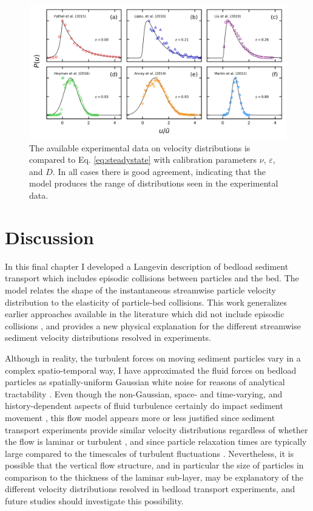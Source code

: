 \begin{figure}
	\centerline{\includegraphics{./figures/ch5/Fig4expComparison.png}}
	\caption{The available experimental data on velocity distributions is compared to Eq. \ref{eq:steadystate} with calibration parameters $\nu$, $\varepsilon$, and $D$. In all cases there is good agreement, indicating that the model produces the range of distributions seen in the experimental data.} \label{fig:fig4ch5}
\end{figure}


\section{Discussion}
\label{sec:langdiscussion}

In this final chapter I developed a Langevin description of bedload sediment transport which includes episodic collisions between particles and the bed.
The model relates the shape of the instantaneous streamwise particle velocity distribution to the elasticity of particle-bed collisions.
This work generalizes earlier approaches available in the literature which did not include episodic collisions \citep{Ancey2014,Fan2014}, and provides a new physical explanation for the different streamwise sediment velocity distributions resolved in experiments.

Although in reality, the turbulent forces on moving sediment particles vary in a complex spatio-temporal way, I have approximated the fluid forces on bedload particles as spatially-uniform Gaussian white noise for reasons of analytical tractability \cite[e.g.][]{Michaelides1997}. Even though the non-Gaussian, space- and time-varying, and history-dependent aspects of fluid turbulence certainly do impact sediment movement \citep{Cameron2020,Celik2014}, this flow model appears more or less justified since sediment transport experiments provide similar velocity distributions regardless of whether the flow is laminar or turbulent \citep{Lajeunesse2010, Charru2004}, and since particle relaxation times are typically large compared to the timescales of turbulent fluctuations \citep{Hofland2006,Schmeeckle2007,Nakagawa1981}.
Nevertheless, it is possible that the vertical flow structure, and in particular the size of particles in comparison to the thickness of the laminar sub-layer, may be explanatory of the different velocity distributions resolved in bedload transport experiments, and future studies should investigate this possibility.

